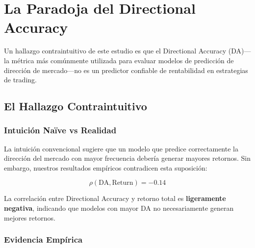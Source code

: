 
\section{La Paradoja del Directional Accuracy}
\label{sec:da_paradox}

Un hallazgo contraintuitivo de este estudio es que el Directional Accuracy (DA)---la m\'etrica m\'as com\'unmente utilizada para evaluar modelos de predicci\'on de direcci\'on de mercado---no es un predictor confiable de rentabilidad en estrategias de trading.

\subsection{El Hallazgo Contraintuitivo}
\label{subsec:counterintuitive}

\subsubsection{Intuici\'on Na\"ive vs Realidad}

La intuici\'on convencional sugiere que un modelo que predice correctamente la direcci\'on del mercado con mayor frecuencia deber\'ia generar mayores retornos. Sin embargo, nuestros resultados emp\'iricos contradicen esta suposici\'on:

\begin{equation}
\rho(\text{DA}, \text{Return}) = -0.14
\end{equation}

La correlaci\'on entre Directional Accuracy y retorno total es \textbf{ligeramente negativa}, indicando que modelos con mayor DA no necesariamente generan mejores retornos.

\subsubsection{Evidencia Emp\'irica}

